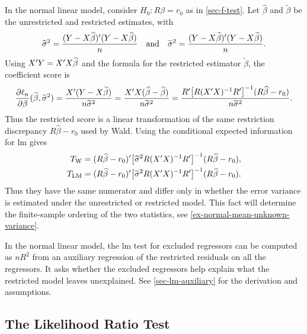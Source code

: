 \documentclass[a4paper,12pt]{article}
\begin{document}
\begin{remark}
	In the normal linear model, consider $H_0:R\beta=r_0$ as in \autoref{sec-f-test}.
	Let $\widehat\beta$ and $\widetilde\beta$ be the unrestricted and restricted estimates, with
	\begin{align*}
		\widehat\sigma^2=\frac{(Y-X\widehat\beta)^{\prime}(Y-X\widehat\beta)}{n}
		\quad\text{and}\quad
		\widetilde\sigma^2=\frac{(Y-X\widetilde\beta)^{\prime}(Y-X\widetilde\beta)}{n}.
	\end{align*}
	Using $X^{\prime} Y=X^{\prime} X\widehat\beta$ and the formula for the restricted estimator $\widetilde\beta$, the coefficient score is
	\begin{align*}
		\frac{\partial\ell_n}{\partial\beta}(\widetilde\beta,\widetilde\sigma^2)
		=\frac{X^{\prime}(Y-X\widetilde\beta)}{n\widetilde\sigma^2}
		=\frac{X^{\prime} X(\widehat\beta-\widetilde\beta)}{n\widetilde\sigma^2}
		=\frac{R^{\prime}\big[R(X^{\prime} X)^{-1} R^{\prime}\big]^{-1}(R\widehat\beta-r_0)}{n\widetilde\sigma^2}.
	\end{align*}
	Thus the restricted score is a linear transformation of the same restriction discrepancy $R\widehat\beta-r_0$ used by Wald.
	Using the conditional expected information for \gls{lm} gives
	\begin{align*}
		T_{\mathrm W}
		&=(R\widehat\beta-r_0)^{\prime}\big[{\widehat\sigma^2}R(X^{\prime} X)^{-1} R^{\prime}\big]^{-1}(R\widehat\beta-r_0),\\
		T_{\mathrm{LM}}
		&=(R\widehat\beta-r_0)^{\prime}\big[{\widetilde\sigma^2}R(X^{\prime} X)^{-1} R^{\prime}\big]^{-1}(R\widehat\beta-r_0).
	\end{align*}
	Thus they have the same numerator and differ only in whether the error variance is estimated under the unrestricted or restricted model.
	This fact will determine the finite-sample ordering of the two statistics, see \autoref{ex-normal-mean-unknown-variance}.
\end{remark}

\begin{remark}
	In the normal linear model, the \gls{lm} test for excluded regressors can be computed as $nR^2$
	from an auxiliary regression of the restricted residuals on all the regressors.
	It asks whether the excluded regressors help explain what the restricted model leaves unexplained.
	See \autoref{sec-lm-auxiliary} for the derivation and assumptions.
\end{remark}

\subsection{The Likelihood Ratio Test}
\end{document}
